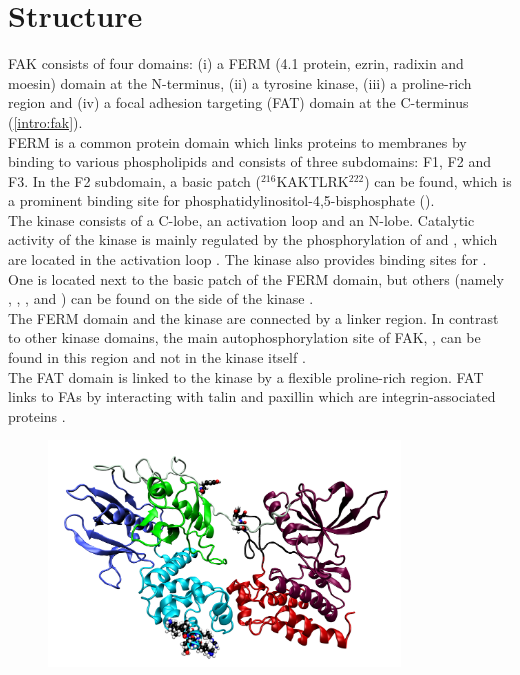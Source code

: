 \section{Structure}
FAK consists of four domains: (i) a FERM (4.1 protein, ezrin, radixin and moesin) domain at the N-terminus, (ii) a tyrosine kinase, (iii) a proline-rich region and (iv) a focal adhesion targeting (FAT) domain at the C-terminus (\autoref{intro:fak}).\\
FERM is a common protein domain which links proteins to membranes by binding to various phospholipids \autocite{fermdomain} and consists of three subdomains: F1, F2 and F3. In the F2 subdomain, a basic patch ($^{216}$KAKTLRK$^{222}$) can be found, which is a prominent binding site for phosphatidylinositol-4,5-bisphosphate (\pip).\\
The kinase consists of a C-lobe, an activation loop and an N-lobe. Catalytic activity of the kinase is mainly regulated by the phosphorylation of  and , which are located in the activation loop \autocite{tyrosinePhosphor}. The kinase also provides binding sites for \pip{}. One is located next to the basic patch of the FERM domain, but others (namely , , ,  and ) can be found on the side of the kinase \autocites{pap002}{pap002Exp}.\\
The FERM domain and the kinase are connected by a linker region. In contrast to other kinase domains, the main autophosphorylation site of FAK, , can be found in this region and not in the kinase itself \autocite{pap001}.\\ %
The FAT domain is linked to the kinase by a flexible proline-rich region. FAT links to FAs by interacting with talin and paxillin which are integrin-associated proteins \autocite{fatdomain}.
%
%
%
\begin{figure}
	\centering
	\includegraphics[height=6cm]{figures/introduction/fak}
	\label{intro:fak}
\end{figure}
%
%
%
